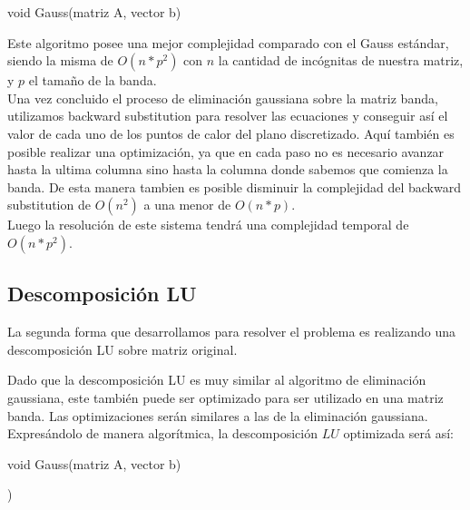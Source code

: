 \begin{algorithm}
\begin{algorithmic}[1]\parskip=1mm
\caption{void Gauss(matriz A, vector b)}
\end{algorithmic}
\end{algorithm}

Este algoritmo posee una mejor complejidad comparado con el Gauss estándar, siendo la misma de $O(n*p^2)$ con $n$ la cantidad de incógnitas de nuestra matriz, y $p$ el tamaño de la banda.
\\
Una vez concluido el proceso de eliminación gaussiana sobre la matriz banda, utilizamos backward substitution para resolver las ecuaciones y conseguir así el valor de cada uno de los puntos de calor del plano discretizado. Aquí también es posible realizar una optimización, ya que en cada paso no es necesario avanzar hasta la ultima columna sino hasta la columna donde sabemos que comienza la banda. De esta manera tambien es posible disminuir la complejidad del backward substitution de $O(n^2)$ a una menor de $O(n*p)$.
\\
Luego la resolución de este sistema tendrá una complejidad temporal de $O(n*p^2)$.

\subsection{Descomposición LU}

La segunda forma que desarrollamos para resolver el problema es realizando una descomposición LU sobre matriz original.

Dado que la descomposición LU es muy similar al algoritmo de eliminación gaussiana, este también puede ser optimizado para ser utilizado en una matriz banda. Las optimizaciones serán similares a las de la eliminación gaussiana. Expresándolo de manera algorítmica, la descomposición $LU$ optimizada será así:

\begin{algorithm}
\begin{algorithmic}[1]\parskip=1mm
\caption{void Gauss(matriz A, vector b)}
   )
\end{algorithmic}
\end{algorithm}

